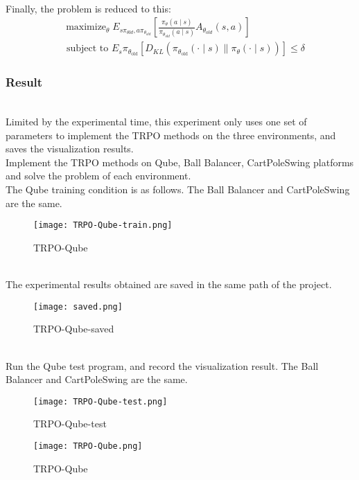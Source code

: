 \documentclass[12pt]{article}
\begin{document}
~\\\indent Finally, the problem is reduced to this:
~\\$$
\begin{aligned}
&\operatorname{maximize}_{\theta} E_{s \pi_{\theta l d}, a \pi_{\theta_{o l d}}}\left[\frac{\pi_{\theta}(a \mid s)}{\pi_{\theta_{o l d}}(a \mid s)} A_{\theta_{o l d}}(s, a)\right]\\
&\text { subject to } E_{s} \pi_{\theta_{\text {old}}}\left[D_{K L}\left(\pi_{\theta_{\text {old}}}(\cdot \mid s) \| \pi_{\theta}(\cdot \mid s)\right)\right] \leq \delta
\end{aligned}
$$

\subsubsection{Result}

~\\\indent Limited by the experimental time, this experiment only uses one set of parameters to implement the TRPO methods on the three environments, and saves the visualization results.
~\\\indent Implement the TRPO methods on Qube, Ball Balancer, CartPoleSwing platforms and solve the problem of each environment.
~\\\indent The Qube training condition is as follows. The Ball Balancer and CartPoleSwing are the same.
\begin{figure}[H]
    \centering
    \texttt{[image: TRPO-Qube-train.png]}
    \caption{TRPO-Qube}
\end{figure}

~\\\indent The experimental results obtained are saved in the same path of the project.
\begin{figure}[H]
    \centering
    \texttt{[image: saved.png]}
    \caption{TRPO-Qube-saved}
\end{figure}

~\\\indent Run the Qube test program, and record the visualization result. The Ball Balancer and CartPoleSwing are the same.
\begin{figure}[H]
    \centering
    \texttt{[image: TRPO-Qube-test.png]}
    \caption{TRPO-Qube-test}
\end{figure}

\begin{figure}[H]
    \centering
    \texttt{[image: TRPO-Qube.png]}
    \caption{TRPO-Qube}
\end{figure}
\end{document}

